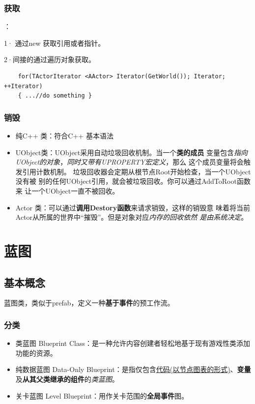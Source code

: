 \documentclass[UTF8,a4paper,12pt]{ctexbook}
\begin{document}
		\subsection{获取}：
		
			1· 通过new 获取引用或者指针。
			
			2·间接的通过遍历对象获取。
			
			\begin{lstlisting}
	for(TActorIterator <AActor> Iterator(GetWorld()); Iterator; ++Iterator) 
	{ ...//do something }			
			\end{lstlisting}
		
		\subsection{销毁}
			\begin{itemize}
				\item 纯C++ 类：符合C++ 基本语法
				\item UObject类：UObject采用自动垃圾回收机制。当一个\textbf{类的成员} 变量包含\textit{指向UObject的对象}，\textit{同时又带有UPROPERTY宏定义}，那么 这个成员变量将会触发引用计数机制。 垃圾回收器会定期从根节点Root开始检查，当一个UObject没有被 别的任何UObject引用，就会被垃圾回收。你可以通过AddToRoot函数来 让一个UObject一直不被回收。
				\item Actor 类：可以通过\textbf{调用Destory函数}来请求销毁，这样的销毁意 味着将当前Actor从所属的世界中“摧毁”。但是对象对应\textit{内存的回收依然 是由系统决定}。
			\end{itemize}
		


\chapter{蓝图}
	\section{基本概念}
	
		蓝图类，类似于prefab，定义一种\textbf{基于事件}的预工作流。
		
		\subsection{分类}
			
			\begin{itemize}
				\item 类蓝图 Blueprint Class：是一种允许内容创建者轻松地基于现有游戏性类添加功能的资源。
				\item 纯数据蓝图 Data-Only Blueprint：是指仅包含\underline{代码(以节点图表的形式)}、\textbf{变量}及\textbf{从其父类继承的组件}的\textit{类蓝图}。
				\item 关卡蓝图 Level Blueprint：用作关卡范围的\textbf{全局事件}图。
			\end{itemize}
		
\end{document}
